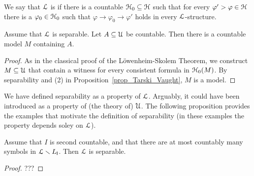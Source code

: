 \documentclass[10pt,oneside]{amsproc}
\renewcommand*{\emph}[1]{%
   \smash{\tikz[baseline]\node[rectangle, fill=teal!25, rounded corners, inner xsep=0.5ex, inner ysep=0.2ex, anchor=base, minimum height = 2.7ex]{\strut #1};}}
\begin{document}
We say that ${\EuScript L}$ is \emph{separable\/} if there is a countable  ${\EuScript H}_0\subseteq{\EuScript H}$ such that for every $\varphi'>\varphi\in{\EuScript H}$ there is a $\varphi_0\in{\EuScript H}_0$ such that $\varphi\rightarrow\varphi_0\rightarrow\varphi'$ holds in every ${\EuScript L}$-structure.

\begin{proposition}
  Assume that ${\EuScript L}$ is separable.
  Let $A\subseteq{\EuScript U}$ be countable.
  Then there is a countable model $M$ containing $A$. 
\end{proposition}

\begin{proof}
  As in the classical proof of the L\"owenheim-Skolem Theorem,
  we construct $M\subseteq{\EuScript U}$ that contain a witness for every consistent formula in ${\EuScript H}_0(M)$.
  By separability and (2) in Proposition~\ref{prop_Tarski_Vaught}, $M$ is a model.
\end{proof}

We have defined separability as a property of ${\EuScript L}$.
Arguably, it could have been introduced as a property of (the theory of) ${\EuScript U}$.
The following proposition provides the examples that motivate the definition of separability (in these examples the property depends soley on ${\EuScript L}$).

\begin{proposition}
  Assume that $I$ is second countable, and that there are at most countably many symbols in ${\EuScript L}\smallsetminus L_{\sf I}$.
  Then ${\EuScript L}$ is separable.
\end{proposition}
\begin{proof}
  ???
\end{proof}



\end{document}
